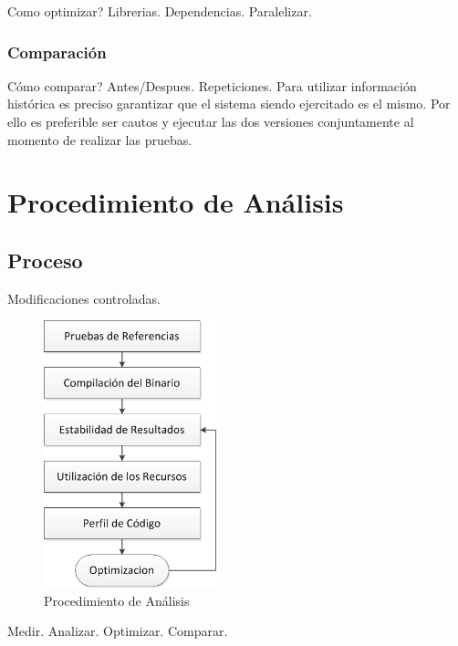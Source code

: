 \documentclass[a4paper]{report}
\begin{document}
Como optimizar? Librerias. Dependencias. Paralelizar.

\subsection{Comparaci\'on}

C\'omo comparar? Antes/Despues. Repeticiones. Para utilizar informaci\'on
hist\'orica es preciso garantizar que el sistema siendo ejercitado es el mismo. Por ello es preferible ser cautos y ejecutar las dos versiones conjuntamente
al momento de realizar las pruebas. 

\chapter{Procedimiento de An\'alisis}

\section{Proceso}

Modificaciones controladas.

\begin{figure}[H]
\label{fig:procedure}
\begin{center}
\includegraphics[width=5cm]{procedure.png}
\caption{Procedimiento de An\'alisis}
\end{center}
\end{figure}

\bigskip

Medir. Analizar. Optimizar. Comparar.
\end{document}
